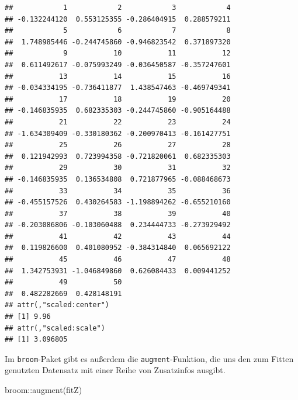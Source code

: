 \documentclass[
]{book}
\newenvironment{Shaded}{\begin{snugshade}}{\end{snugshade}}
\newcommand{\FunctionTok}[1]{\textcolor[rgb]{0.00,0.00,0.00}{#1}}
\newcommand{\NormalTok}[1]{#1}
\newcommand{\SpecialCharTok}[1]{\textcolor[rgb]{0.00,0.00,0.00}{#1}}
\begin{document}
\begin{verbatim}
##            1            2            3            4 
## -0.132244120  0.553125355 -0.286404915  0.288579211 
##            5            6            7            8 
##  1.748985446 -0.244745860 -0.946823542  0.371897320 
##            9           10           11           12 
##  0.611492617 -0.075993249 -0.036450587 -0.357247601 
##           13           14           15           16 
## -0.034334195 -0.736411877  1.438547463 -0.469749341 
##           17           18           19           20 
## -0.146835935  0.682335303 -0.244745860 -0.905164488 
##           21           22           23           24 
## -1.634309409 -0.330180362 -0.200970413 -0.161427751 
##           25           26           27           28 
##  0.121942993  0.723994358 -0.721820061  0.682335303 
##           29           30           31           32 
## -0.146835935  0.136534808  0.721877965 -0.088468673 
##           33           34           35           36 
## -0.455157526  0.430264583 -1.198894262 -0.655210160 
##           37           38           39           40 
## -0.203086806 -0.103060488  0.234444733 -0.273929492 
##           41           42           43           44 
##  0.119826600  0.401080952 -0.384314840  0.065692122 
##           45           46           47           48 
##  1.342753931 -1.046849860  0.626084433  0.009441252 
##           49           50 
##  0.482282669  0.428148191 
## attr(,"scaled:center")
## [1] 9.96
## attr(,"scaled:scale")
## [1] 3.096805
\end{verbatim}

Im \texttt{broom}-Paket gibt es außerdem die \texttt{augment}-Funktion, die uns den zum Fitten genutzten Datensatz mit einer Reihe von Zusatzinfos ausgibt.

\begin{Shaded}
\begin{Highlighting}[]
\NormalTok{broom}\SpecialCharTok{::}\FunctionTok{augment}\NormalTok{(fitZ)}
\end{Highlighting}
\end{Shaded}
\end{document}

